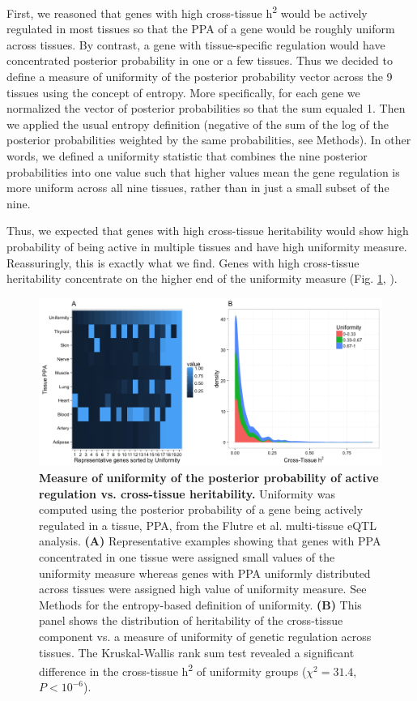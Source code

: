 \documentclass[10pt,letterpaper]{article}
\begin{document}
First, we reasoned that genes with high cross-tissue h\textsuperscript{2} would be actively regulated in most tissues so that the PPA of a gene would be roughly uniform across tissues. By contrast, a gene with tissue-specific regulation would have concentrated posterior probability in one or a few tissues. Thus we decided to define a measure of uniformity of the posterior probability vector across the 9 tissues using the concept of entropy. More specifically, for each gene we normalized the vector of posterior probabilities so that the sum equaled 1. Then we applied the usual entropy definition (negative of the sum of the log of the posterior probabilities weighted by the same probabilities, see Methods). In other words, we defined a uniformity statistic that combines the nine posterior probabilities into one value such that higher values mean the gene regulation is more uniform across all nine tissues, rather than in just a small subset of the nine.

Thus, we expected that genes with high cross-tissue heritability would show high probability of being active in multiple tissues and have high uniformity measure. Reassuringly, this is exactly what we find. Genes with high cross-tissue heritability concentrate on the higher end of the uniformity measure (Fig. \ref{fig-ct-entropy}, ). 

\begin{figure}[H]
\includegraphics[width=13cm]{Figures/Fig-CT-entropy-ppa.png}
\caption{{\bf Measure of uniformity of the posterior probability of active regulation vs. cross-tissue heritability.}
Uniformity was computed using the posterior probability of a gene being actively regulated in a tissue, PPA, from the Flutre et al. \cite{Flutre_2013} multi-tissue eQTL analysis. {\bf (A)} Representative examples showing that genes with PPA concentrated in one tissue were assigned small values of the uniformity measure whereas genes with PPA uniformly distributed across tissues were assigned high value of uniformity measure. See Methods for the entropy-based definition of uniformity. {\bf (B)}  This panel shows the distribution of heritability of the cross-tissue component vs. a measure of uniformity of genetic regulation across tissues. 
The Kruskal-Wallis rank sum test revealed a significant difference in the cross-tissue h\textsuperscript{2} of uniformity groups ($\chi^2 = 31.4$, $P < 10^{-6}$).}
\label{fig-ct-entropy}
\end{figure}
\end{document}
